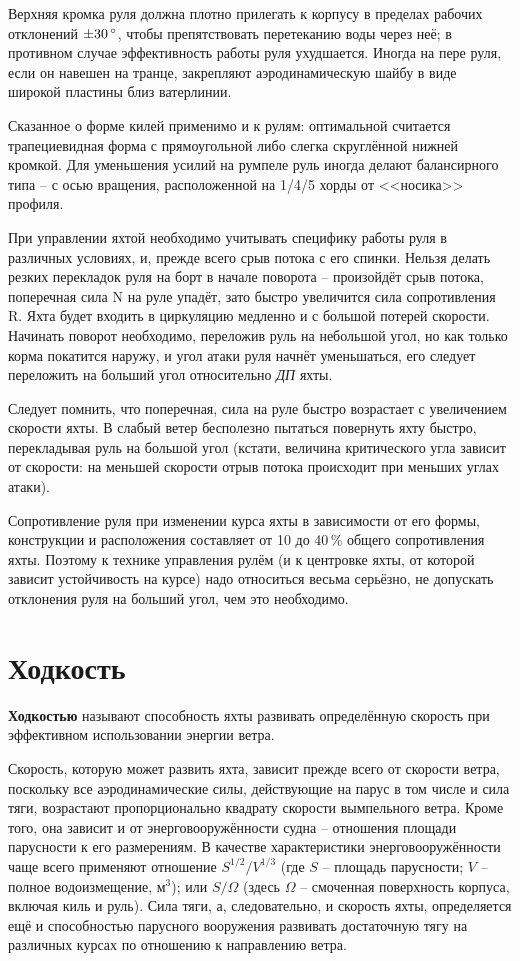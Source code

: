 Верхняя кромка руля должна плотно прилегать к корпусу в пределах
рабочих отклонений $\pm 30\,^\circ$, чтобы препятствовать перетеканию воды
через неё; в противном случае эффективность работы руля
ухудшается. Иногда на пере руля, если он навешен на транце, закрепляют
аэродинамическую шайбу в виде широкой пластины близ ватерлинии.

Сказанное о форме килей применимо и к рулям: оптимальной считается
трапециевидная форма с прямоугольной либо слегка скруглённой нижней
кромкой. Для уменьшения усилий на румпеле руль иногда делают
балансирного типа \--- с осью вращения, расположенной на 1/4/5
хорды от <<носика>> профиля.

При управлении яхтой необходимо учитывать специфику работы руля в
различных условиях, и, прежде всего срыв потока с его спинки. Нельзя
делать резких перекладок руля на борт в начале поворота \---
произойдёт срыв потока, поперечная сила \ve N на руле упадёт, зато
быстро увеличится сила сопротивления \ve R. Яхта будет входить в
циркуляцию медленно и с большой потерей скорости. Начинать поворот
необходимо, переложив руль на небольшой угол, но как только корма
покатится наружу, и угол атаки руля начнёт уменьшаться, его следует
переложить на больший угол относительно \textit{ДП} яхты.

Следует помнить, что поперечная, сила на руле быстро возрастает с
увеличением скорости яхты. В слабый ветер бесполезно пытаться
повернуть яхту быстро, перекладывая руль на большой угол (кстати,
величина критического угла зависит от скорости: на меньшей скорости
отрыв потока происходит при меньших углах атаки).

Сопротивление руля при изменении курса яхты в зависимости от его
формы, конструкции и расположения составляет от 10 до 40\,\% общего
сопротивления яхты. Поэтому к технике управления рулём (и к центровке
яхты, от которой зависит устойчивость на курсе) надо относиться весьма
серьёзно, не допускать отклонения руля на больший угол, чем это
необходимо.

\section{Ходкость}

\textbf{Ходкостью} называют способность яхты развивать
определённую скорость при эффективном использовании энергии ветра.

Скорость, которую может развить яхта, зависит прежде всего от скорости
ветра, поскольку все аэродинамические силы, действующие на парус в том
числе и сила тяги, возрастают пропорционально квадрату скорости
вымпельного ветра. Кроме того, она зависит и от энерговооружённости
судна \--- отношения площади парусности к его размерениям. В качестве
характеристики энерговооружённости чаще всего применяют отношение
$S^{1/2} / V^{1/3}$ (где $S$ \--- площадь парусности\msq; $V$ \---
полное водоизмещение, м$^3$); или $S / \Omega$ (здесь $\Omega$ \---
смоченная поверхность корпуса, включая киль и руль). Сила тяги, а,
следовательно, и скорость яхты, определяется ещё и способностью
парусного вооружения развивать достаточную тягу на различных курсах по
отношению к направлению ветра.

